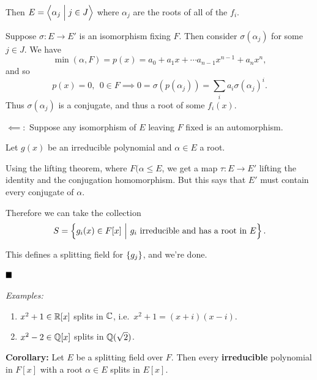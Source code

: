 Then \(E = \left\langle{\alpha_j \mathrel{\Big|}j\in J}\right\rangle\) where \(\alpha_j\) are
the roots of all of the \(f_i\).

Suppose \(\sigma: E \to E'\) is an isomorphism fixing \(F\). Then
consider \(\sigma(\alpha_j)\) for some \(j \in J\). We have \[
\min(\alpha, F) = p(x) = a_0 + a_1 x + \cdots a_{n-1}x^{n-1} + a_n x^n
,\] and so \[
p(x) = 0,~~ 0\in F \implies 0 = \sigma(p(\alpha_j)) = \sum_i a_i \sigma(\alpha_j)^i
.\] Thus \(\sigma(\alpha_j)\) is a conjugate, and thus a root of some
\(f_i(x)\).

\(\impliedby:\) Suppose any isomorphism of \(E\) leaving \(F\) fixed is
an automorphism.

Let \(g(x)\) be an irreducible polynomial and \(\alpha \in E\) a root.

\begin{center}
\end{center}

Using the lifting theorem, where \(F(\alpha \leq E\), we get a map
\(\tau: E \to E'\) lifting the identity and the conjugation
homomorphism. But this says that \(E'\) must contain every conjugate of
\(\alpha\).

Therefore we can take the collection \[
S = \left\{{g_i(x) \in F[x] {~\mathrel{\Big|}~} g_i \text{ irreducible and has a root in } E}\right\}
.\]

This defines a splitting field for \(\left\{{g_j}\right\}\), and we're done.

\(\qed\)

\emph{Examples:}

\begin{enumerate}
\def\labelenumi{\arabic{enumi}.}
\tightlist
\item
  \(x^2 + 1 \in {\mathbb{R}}[x]\) splits in \({\mathbb{C}}\),
  i.e.~\(x^2 + 1 = (x+i)(x-i)\).
\item
  \(x^2 - 2 \in {\mathbb{Q}}[x]\) splits in \({\mathbb{Q}}(\sqrt 2)\).
\end{enumerate}

\textbf{Corollary:} Let \(E\) be a splitting field over \(F\). Then
every \textbf{irreducible} polynomial in \(F[x]\) with a root
\(\alpha \in E\) splits in \(E[x]\).


